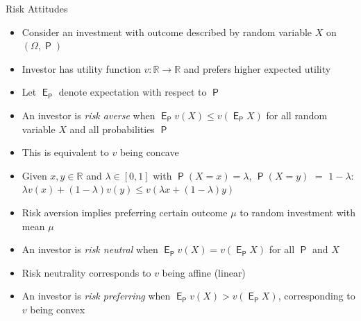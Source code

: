 \documentclass[10pt,handout]{beamer}
\newcommand{\ds}{\displaystyle}
\DeclareMathOperator\prb{\mathsf{P}}
\DeclareMathOperator\expc{\mathsf{E}}
\theoremstyle{definition}
\begin{document}
\begin{frame}{Risk Attitudes}
  \begin{itemize}[<+->]
    \item Consider an investment with outcome described by random variable $X$ on $(\Omega, \prb)$
    \item Investor has utility function $v: \mathbb{R} \to \mathbb{R}$ and prefers higher expected utility
    \item Let $\expc_{\prb}$ denote expectation with respect to $\prb$
    \item An investor is \emph{risk averse} when $\ds\expc_{\prb} v(X) \leqslant v(\expc_{\prb} X)$
      for all random variable $X$ and all probabilities $\prb$
    \item This is equivalent to $v$ being concave
    \item Given $x, y \in \mathbb{R}$ and $\lambda \in [0, 1]$ with $\prb(X = x) = \lambda$, $\ds\prb(X = y)$ $=$ $\ds 1 - \lambda$: $\ds\lambda v(x) + (1-\lambda)v(y) \leqslant v(\lambda x + (1-\lambda)y)$
    \item Risk aversion implies preferring certain outcome $\mu$ to random investment with mean $\mu$
    \item An investor is \emph{risk neutral} when $\expc_{\prb} v(X) = v(\expc_{\prb} X)$ for all $\prb$ and $X$
    \item Risk neutrality corresponds to $v$ being affine (linear)
    \item An investor is \emph{risk preferring} when $\expc_{\prb} v(X) > v(\expc_{\prb} X)$, corresponding to $v$ being convex
  \end{itemize}
\end{frame}
\end{document}
